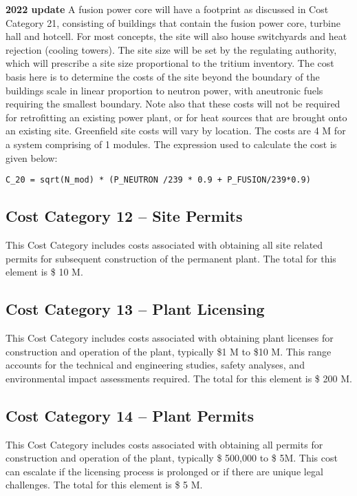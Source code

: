  \textbf{2022 update} 
A fusion power core will have a footprint as discussed in Cost Category 21, consisting of buildings that contain the fusion power core, turbine hall and hotcell. For most concepts, the site will also house switchyards and heat rejection (cooling towers). The site size will be set by the regulating authority, which will prescribe a site size proportional to the tritium inventory.  The cost basis here is to determine the costs of the site beyond the boundary of the buildings scale in linear proportion to neutron power, with aneutronic fuels requiring the smallest boundary.  Note also that these costs will not be required for retrofitting an existing power plant, or for heat sources that are brought onto an existing site.  Greenfield site costs will vary by location. The costs are 4 M for a system comprising of 1 modules. 
 The expression used to calculate the cost is given below: 
\begin{verbatim} 
C_20 = sqrt(N_mod) * (P_NEUTRON /239 * 0.9 + P_FUSION/239*0.9)\end{verbatim} 


\subsection*{Cost Category 12 – Site Permits} 
This Cost Category includes costs associated with obtaining all site related permits for subsequent construction of the permanent plant.  The total for this element is \$ 10 M.

\subsection*{Cost Category 13 – Plant Licensing} 
This Cost Category includes costs associated with obtaining plant licenses for construction and operation of the plant, typically \$1 M to \$10 M. This range accounts for the technical and engineering studies, safety analyses, and environmental impact assessments required.  The total for this element is \$ 200 M.

\subsection*{Cost Category 14 – Plant Permits} 
This Cost Category includes costs associated with obtaining all permits for construction and operation of the plant, typically \$ 500,000 to \$ 5M. This cost can escalate if the licensing process is prolonged or if there are unique legal challenges.  The total for this element is \$ 5 M.

